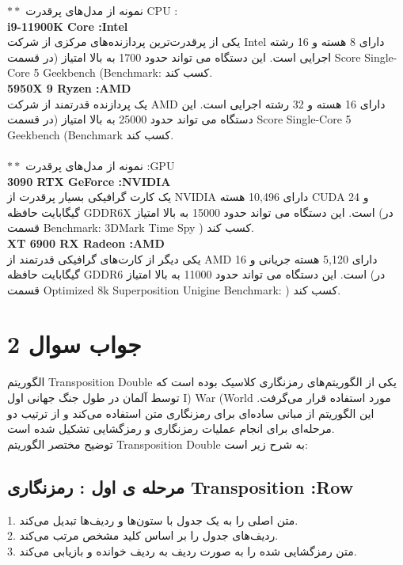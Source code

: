 \(**\) نمونه از مدل‌های پرقدرت CPU :\\
\textbf{i9-11900K Core :Intel}\\
یکی از پرقدرت‌ترین پردازنده‌های مرکزی از شرکت Intel  
دارای 8 هسته و 16 رشته اجرایی است.
 این دستگاه می تواند حدود 1700 به بالا امتیاز (در قسمت  Score Single-Core 5 Geekbench (Benchmark: کسب کند.\\
\textbf{5950X 9 Ryzen :AMD}\\
یک پردازنده قدرتمند از شرکت  AMD
دارای 16 هسته و 32 رشته اجرایی است.
این دستگاه می تواند حدود 25000 به بالا امتیاز (در قسمت Score Single-Core 5 Geekbench (Benchmark کسب کند. \\ \\
\(**\) نمونه از مدل‌های پرقدرت :GPU   \\
\textbf{3090 RTX GeForce :NVIDIA}\\
یک کارت گرافیکی بسیار پرقدرت از NVIDIA
دارای 10,496 هسته CUDA و 24 گیگابایت حافظه GDDR6X است.
این دستگاه می تواند حدود 15000 به بالا امتیاز (در قسمت Benchmark: 3DMark Time Spy ) کسب کند. \\
\textbf{XT 6900 RX Radeon :AMD}\\
یکی دیگر از کارت‌های گرافیکی قدرتمند از AMD 
دارای 5,120 هسته جریانی و 16 گیگابایت حافظه GDDR6 است.
این دستگاه می تواند حدود 11000 به بالا امتیاز (در قسمت Optimized 8k Superposition Unigine Benchmark: ) کسب کند.


\section{جواب سوال 2}

الگوریتم Transposition Double یکی از الگوریتم‌های رمزنگاری کلاسیک بوده است که توسط آلمان در طول جنگ جهانی اول I) War (World مورد استفاده قرار می‌گرفت. این الگوریتم از مبانی ساده‌ای برای رمزنگاری متن استفاده می‌کند و از ترتیب دو مرحله‌ای برای انجام عملیات رمزنگاری و رمزگشایی تشکیل شده است. \\
توضیح مختصر الگوریتم Transposition Double به شرح زیر است:

\subsection{مرحله ی اول : رمزنگاری  Transposition :Row}
1. متن اصلی را به یک جدول با ستون‌ها و ردیف‌ها تبدیل می‌کند. \\
2. ردیف‌های جدول را بر اساس کلید مشخص مرتب می‌کند. \\
3. متن رمزگشایی شده را به صورت ردیف به ردیف خوانده و بازیابی می‌کند. 

